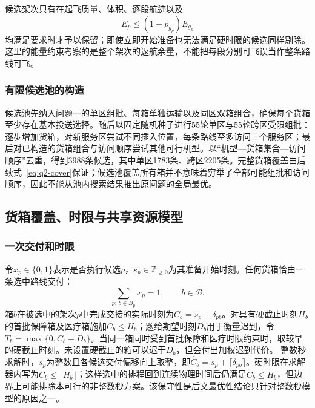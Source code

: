 \documentclass[bwprint,fontset=fandol]{gmcmthesis}
\begin{document}
候选架次只有在起飞质量、体积、逐段航迹以及
\[
E_p\le(1-p_{g_p})E_{g_p}
\]
均满足要求时才予以保留；即使立即开始准备也无法满足硬时限的候选同样剔除。这里的能量约束考察的是整个架次的返航余量，不能把每段分别可飞误当作整条路线可飞。

\subsubsection{有限候选池的构造}
候选池先纳入问题一的单区组批、每箱单独运输以及同区双箱组合，确保每个货箱至少存在基本投送选择。随后以固定随机种子进行55轮单区与55轮跨区受限组批：逐步增加货箱，对新服务区尝试不同插入位置，每条路线至多访问三个服务区；最后对已构造的货箱组合与访问顺序尝试其他可行机型。以“机型—货箱集合—访问顺序”去重，得到3988条候选，其中单区1783条、跨区2205条。完整货箱覆盖由后续式~\eqref{eq:q2-cover}保证；候选池覆盖所有箱并不意味着穷举了全部可能组批和访问顺序，因此不能从池内搜索结果推出原问题的全局最优。

\subsection{货箱覆盖、时限与共享资源模型}
\subsubsection{一次交付和时限}
令$x_p\in\{0,1\}$表示是否执行候选$p$，$s_p\in\mathbb Z_{\geq0}$为其准备开始时刻。任何货箱恰由一条选中路线交付：
\begin{equation}
\sum_{p:\,b\in B_p}x_p=1,\qquad b\in\mathcal B.
\label{eq:q2-cover}
\end{equation}
箱$b$在被选中的架次$p$中完成交接的实际时刻为$C_b=s_p+\delta_{pb}$。对具有硬截止时刻$H_b$的首批保障箱及医疗箱施加$C_b\le H_b$；题给期望时刻$D_b$用于衡量迟到，令$T_b=\max\{0,C_b-D_b\}$。当同一箱同时受到首批保障和医疗时限约束时，取较早的硬截止时刻。未设置硬截止的箱可以迟于$D_b$，但会付出加权迟到代价。
整数秒求解时，$s_p$为整数且各候选交付偏移向上取整，即$\widehat C_b=s_p+\lceil\delta_{pb}\rceil$。硬时限在求解器内写为$\widehat C_b\le\lfloor H_b\rfloor$；这样选中的排程回到连续物理时间后仍满足$C_b\le H_b$，但边界上可能排除本可行的非整数秒方案。该保守性是后文最优性结论只针对整数秒模型的原因之一。
\end{document}
